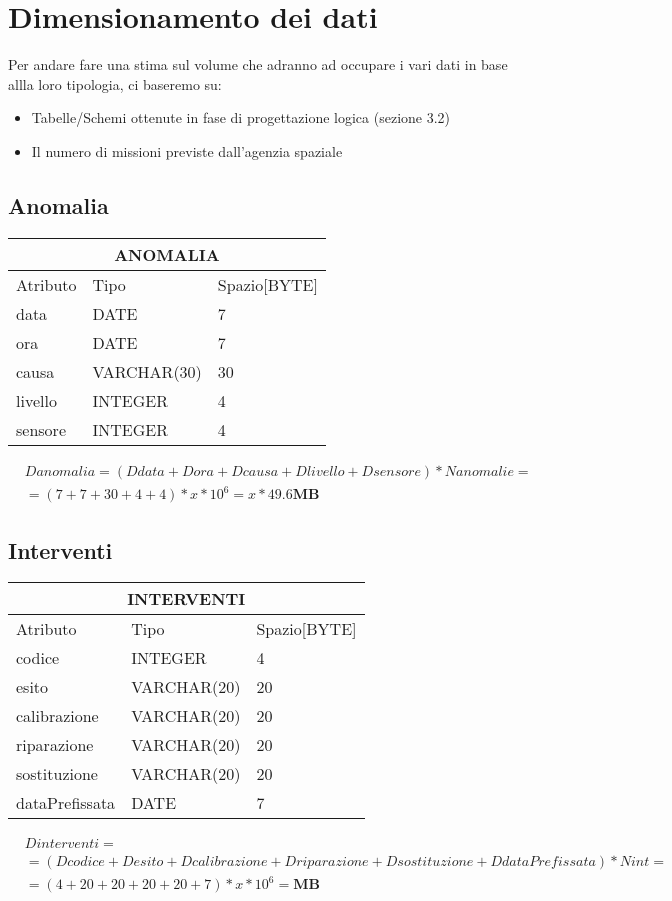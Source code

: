 \section{Dimensionamento dei dati}
Per andare fare una stima sul volume che adranno ad occupare i vari dati in base allla loro tipologia, ci baseremo su:
\begin{itemize}
\item Tabelle/Schemi ottenute in fase di progettazione logica (sezione 3.2)
\item Il numero di missioni previste dall'agenzia spaziale
\end{itemize}
\subsection{Anomalia}
\begin{tabular}{ |p{3cm}|p{3cm}|p{3cm}|}
 \hline
 \multicolumn{3}{|c|}{\textbf{ANOMALIA}} \\
 \hline
Atributo & Tipo & Spazio[BYTE] \\
 \hline
data & DATE & 7 \\
ora & DATE & 7 \\
causa & VARCHAR(30) & 30 \\
livello & INTEGER & 4 \\
sensore & INTEGER & 4 \\
 \hline
\end{tabular}
\begin{equation}
\begin{aligned}
&Danomalia=(Ddata + Dora +Dcausa +Dlivello + Dsensore) * Nanomalie=\\
&=(7+7+30+4+4)*x*10^6=x*49.6  \textbf{MB}
\end{aligned}
\end{equation}
\subsection{Interventi}
\begin{tabular}{ |p{3cm}|p{3cm}|p{3cm}|}
 \hline
 \multicolumn{3}{|c|}{\textbf{INTERVENTI}} \\
 \hline
Atributo & Tipo & Spazio[BYTE] \\
 \hline
codice & INTEGER & 4 \\
esito & VARCHAR(20) & 20 \\
calibrazione & VARCHAR(20) & 20 \\
riparazione & VARCHAR(20) & 20 \\
sostituzione & VARCHAR(20) & 20 \\
dataPrefissata & DATE & 7 \\
 \hline
\end{tabular}
\begin{equation}
\begin{aligned}
&Dinterventi =\\
&=(Dcodice + Desito +Dcalibrazione +Driparazione + Dsostituzione + DdataPrefissata) * Nint =\\
&=(4+20+20+20+20+7)*x*10^6= \textbf{MB}
\end{aligned}
\end{equation}
